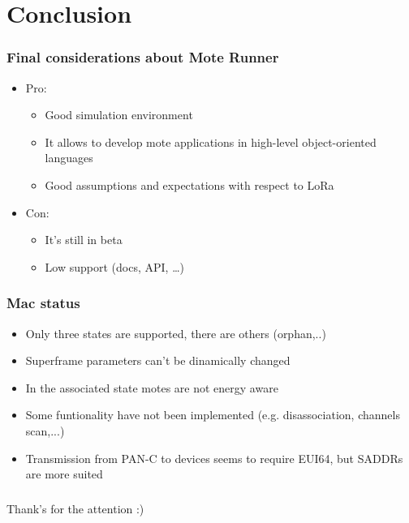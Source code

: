 \section{Conclusion} 

\begin{frame}[fragile]
  \frametitle{Final considerations about Mote Runner}
   \begin{itemize}
    \item Pro:
    \begin{itemize}
      \item Good simulation environment
      \item It allows to develop mote applications in high-level object-oriented languages
      \item Good assumptions and expectations with respect to LoRa
    \end{itemize}
    \item Con:
    \begin{itemize}
      \item It's still in beta
      \item Low support (docs, API, \dots)
    \end{itemize}
  \end{itemize}
\end{frame}

\begin{frame}[fragile]
  \frametitle{Mac status}
  \begin{itemize}
    \item Only three states are supported, there are others (orphan,..)
    \item Superframe parameters can't be dinamically changed
    \item In the associated state motes are not energy aware
    \item Some funtionality have not been implemented (e.g. disassociation, channels scan,...)
    \item Transmission from PAN-C to devices seems to require EUI64, but SADDRs are more suited
  \end{itemize}

\end{frame}


\begin{frame}[fragile]
  \frametitle{}
  Thank's for the attention :)
\end{frame}